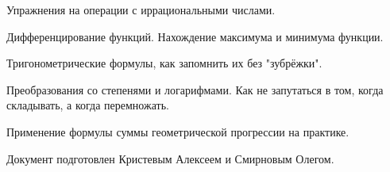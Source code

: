 \documentclass[12pt, a4paper]{article}
\begin{document}
\ii Упражнения на операции с иррациональными числами.

\ii Дифференцирование функций. Нахождение максимума и минимума функции.

\ii Тригонометрические формулы, как запомнить их без "зубрёжки".

\ii Преобразования со степенями и логарифмами. Как не запутаться в том, когда складывать, а когда перемножать.

\ii Применение формулы суммы геометрической прогрессии на практике.

\vfill

\begin{flushright}
    Документ подготовлен Кристевым Алексеем и Смирновым Олегом.
\end{flushright}
	
\vspace{15pt}
\end{document}
